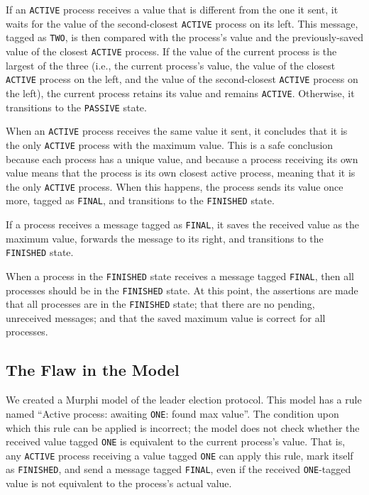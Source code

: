 If an \texttt{ACTIVE} process receives a value that is different from the one
it sent, it waits for the value of the second-closest \texttt{ACTIVE} process
on its left.
This message, tagged as \texttt{TWO}, is then compared with the process's value
and the previously-saved value of the closest \texttt{ACTIVE} process.
If the value of the current process is the largest of the three
(i.e., the current process's value, the value of the closest \texttt{ACTIVE}
process on the left, and the value of the second-closest \texttt{ACTIVE}
process on the left),
the current process retains its value and remains \texttt{ACTIVE}.
Otherwise, it transitions to the \texttt{PASSIVE} state.

When an \texttt{ACTIVE} process receives the same value it sent,
it concludes that it is the only \texttt{ACTIVE} process with the maximum value.
This is a safe conclusion because each process has a unique value, and because
a process receiving its own value means that the process is its own closest
active process, meaning that it is the only \texttt{ACTIVE} process.
When this happens, the process sends its value once more,
tagged as \texttt{FINAL}, and transitions to the \texttt{FINISHED} state.

If a process receives a message tagged as \texttt{FINAL}, it saves the
received value as the maximum value, forwards the message to its right,
and transitions to the \texttt{FINISHED} state.

When a process in the \texttt{FINISHED} state receives a message tagged
\texttt{FINAL}, then all processes should be in the \texttt{FINISHED} state.
At this point, the assertions are made
that all processes are in the \texttt{FINISHED} state;
that there are no pending, unreceived messages;
and that the saved maximum value is correct for all processes.

\subsection{The Flaw in the Model}\label{subsec:the-flaw-in-the-model}

We created a Murphi model of the leader election protocol.
This model has a rule named
``Active process: awaiting \texttt{ONE}: found max value''.
The condition upon which this rule can be applied is incorrect;
the model does not check whether the received value tagged \texttt{ONE} is
equivalent to the current process's value.
That is, any \texttt{ACTIVE} process receiving a value tagged \texttt{ONE}
can apply this rule, mark itself as \texttt{FINISHED}, and send a message
tagged \texttt{FINAL}, even if the received \texttt{ONE}-tagged value is not
equivalent to the process's actual value.

